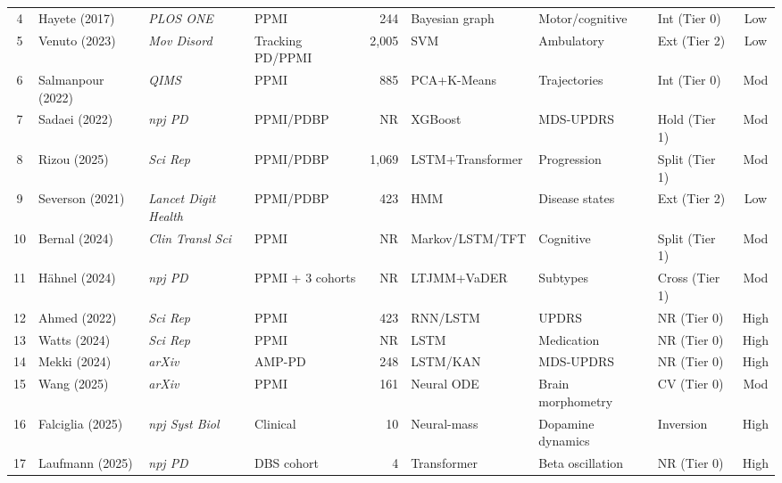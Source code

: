 \begin{landscape}
\begin{longtable}{@{}clllrlllc@{}}
4  & Hayete (2017)     & \textit{PLOS ONE}        & PPMI              & 244    & Bayesian graph    & Motor/cognitive    & Int (Tier 0)   & Low  \\
5  & Venuto (2023)     & \textit{Mov Disord}      & Tracking PD/PPMI  & 2{,}005 & SVM              & Ambulatory         & Ext (Tier 2)   & Low  \\
6  & Salmanpour (2022) & \textit{QIMS}            & PPMI              & 885    & PCA+K-Means       & Trajectories       & Int (Tier 0)   & Mod  \\
7  & Sadaei (2022)     & \textit{npj PD}          & PPMI/PDBP         & NR     & XGBoost           & MDS-UPDRS          & Hold (Tier 1)  & Mod  \\
8  & Rizou (2025)      & \textit{Sci Rep}         & PPMI/PDBP         & 1{,}069 & LSTM+Transformer & Progression        & Split (Tier 1) & Mod  \\
9  & Severson (2021)   & \textit{Lancet Digit Health} & PPMI/PDBP     & 423    & HMM               & Disease states     & Ext (Tier 2)   & Low  \\
10 & Bernal (2024)     & \textit{Clin Transl Sci} & PPMI              & NR     & Markov/LSTM/TFT   & Cognitive          & Split (Tier 1) & Mod  \\
11 & H\"ahnel (2024)   & \textit{npj PD}          & PPMI + 3 cohorts  & NR     & LTJMM+VaDER       & Subtypes           & Cross (Tier 1) & Mod  \\
12 & Ahmed (2022)      & \textit{Sci Rep}         & PPMI              & 423    & RNN/LSTM          & UPDRS              & NR (Tier 0)    & High \\
13 & Watts (2024)      & \textit{Sci Rep}         & PPMI              & NR     & LSTM              & Medication         & NR (Tier 0)    & High \\
14 & Mekki (2024)      & \textit{arXiv}           & AMP-PD            & 248    & LSTM/KAN          & MDS-UPDRS          & NR (Tier 0)    & High \\
15 & Wang (2025)       & \textit{arXiv}           & PPMI              & 161    & Neural ODE        & Brain morphometry  & CV (Tier 0)    & Mod  \\
16 & Falciglia (2025)  & \textit{npj Syst Biol}   & Clinical          & 10     & Neural-mass       & Dopamine dynamics  & Inversion      & High \\
17 & Laufmann (2025)   & \textit{npj PD}          & DBS cohort        & 4      & Transformer       & Beta oscillation   & NR (Tier 0)    & High \\

\end{longtable}
\end{landscape}
